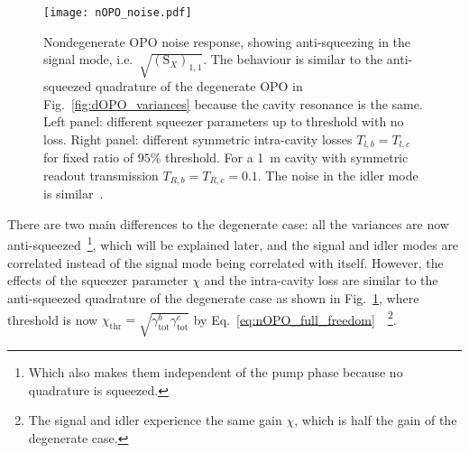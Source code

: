 \begin{figure}
	\centering
	\texttt{[image: nOPO\_noise.pdf]}
	\caption{Nondegenerate OPO noise response, showing anti-squeezing in the signal mode, i.e.\ $\sqrt{(\text{S}_X)_{1,1}}$. The behaviour is similar to the anti-squeezed quadrature of the degenerate OPO in Fig.~\ref{fig:dOPO_variances} because the cavity resonance is the same. Left panel: different squeezer parameters up to threshold with no loss. Right panel: different symmetric intra-cavity losses $T_{l,b}=T_{l,c}$ for fixed ratio of $95\%$ threshold. For a 1~m cavity with symmetric readout transmission $T_{R,b}=T_{R,c}=0.1$. The noise in the idler mode is similar~\cite{schoriNarrowbandFrequencyTunable2002}.}
	\label{fig:nOPO_variances}
\end{figure}

There are two main differences to the degenerate case: all the variances are now anti-squeezed~\footnote{Which also makes them independent of the pump phase because no quadrature is squeezed.}, which will be explained later, and the signal and idler modes are correlated instead of the signal mode being correlated with itself. %
However, the effects of the squeezer parameter $\chi$ and the intra-cavity loss are similar to the anti-squeezed quadrature of the degenerate case as shown in Fig.~\ref{fig:nOPO_variances}, where threshold is now $\chi_\text{thr}=\sqrt{\gamma^b_\text{tot}\gamma^c_\text{tot}}$ by Eq.~\ref{eq:nOPO_full_freedom}~\cite{schoriNarrowbandFrequencyTunable2002,martinelli2001classical}~\footnote{The signal and idler experience the same gain $\chi$, which is half the gain of the degenerate case.}. %
